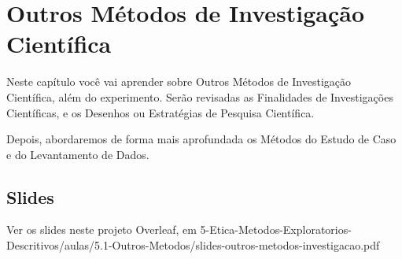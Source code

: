 \chapter{Outros Métodos de Investigação Científica}

Neste capítulo você vai aprender sobre Outros Métodos de Investigação
Científica, além do experimento. Serão revisadas as  Finalidades de Investigações Científicas, e os Desenhos ou Estratégias de Pesquisa Científica.

Depois, abordaremos de forma mais aprofundada os Métodos do Estudo de Caso e do Levantamento de Dados.

\section{Slides}

Ver os slides neste projeto Overleaf, em 5-Etica-Metodos-Exploratorios-Descritivos/aulas/5.1-Outros-Metodos/slides-outros-metodos-investigacao.pdf

%
